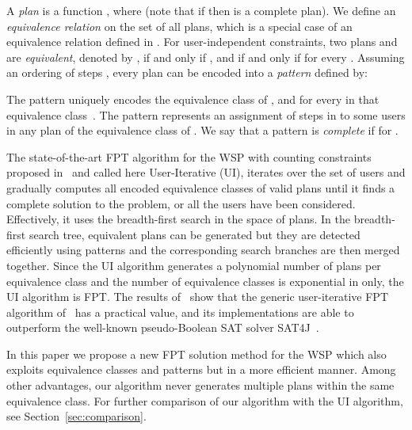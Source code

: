 \documentclass[runningheads,proof]{llncs}
\begin{document}
A \emph{plan} is a function , where  (note that if  then  is a complete plan).  We define an \emph{equivalence relation} on the set of all plans, which is a special case of an equivalence relation defined in \cite{CoCrGaGuJo13}.
For user-independent constraints, two plans  and  are \emph{equivalent}, denoted by , if and only if , and  if and only if  for every .
Assuming an ordering  of steps ,
every plan  can be encoded into a \emph{pattern}  defined by:

The pattern  uniquely encodes the equivalence class of , and  for every  in that equivalence class~\cite{CoCrGaGuJo13}. The pattern  represents an assignment of steps in  to some users in any plan of the equivalence class of .  
We say that a pattern is \emph{complete} if  for .

The state-of-the-art FPT algorithm for the WSP with counting constraints proposed in~\cite{FAW2014} and called here User-Iterative (UI), iterates over the set of users and gradually computes all encoded equivalence classes of valid plans until it finds a complete solution to the problem, or all the users have been considered. 
Effectively, it uses the breadth-first search in the space of plans.  
In the breadth-first search tree, equivalent plans can be generated but they are detected efficiently using patterns and the corresponding search branches are then merged together.  
Since the UI algorithm generates a polynomial number of plans per equivalence class and the number of equivalence classes is exponential in  only, the UI algorithm is FPT.
The results of~\cite{FAW2014,JOCO2014} show that the generic user-iterative FPT algorithm of~\cite{CoCrGaGuJo13} has a practical value, and its implementations are able to outperform the well-known pseudo-Boolean SAT solver SAT4J~\cite{BePa10}.


In this paper we propose a new FPT solution method for the WSP which also exploits equivalence classes and patterns but in a more efficient manner.  
Among other advantages, our algorithm never generates multiple plans within the same equivalence class.  
For further comparison of our algorithm with the UI algorithm, see Section~\ref{sec:comparison}.
\end{document}
